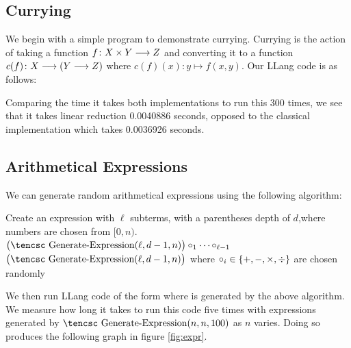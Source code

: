 \documentclass{llncs}
\newcounter{algo}
\begin{document}
\subsection{Currying}

We begin with a simple program to demonstrate currying.
Currying is the action of taking a function $f\colon X\times Y\longrightarrow Z$ and converting it to a function $c(f)\colon X\longrightarrow(Y\longrightarrow Z)$ where $c(f)(x)\colon y\mapsto f(x,y)$.
Our LLang code is as follows:



Comparing the time it takes both implementations to run this 300 times, we see that it takes linear reduction 0.0040886 seconds, opposed to the classical implementation which takes 0.0036926 seconds.

\subsection{Arithmetical Expressions}

We can generate random arithmetical expressions using the following algorithm:

\medskip
\algorithm
\Comment Create an expression with $\ell$ subterms, with a parentheses depth of $d$,\cr where numbers are chosen from $[0,n)$.\EndComment
{}
     \vtop{\hsize=.8\hsize
        \noindent \Return an expression with $\ell$ randomly chosen numbers in\hfil\break $[0,n)$ and $\ell-1$ random operators in $\set{+,-,\times,\div}$.}
    \State \Return $\bigl(\hbox{\tencsc Generate-Expression}(\ell,d-1,n)\bigr)\circ_1\cdots\circ_{\ell-1}$
    \nonum\State \hfill$\bigl(\hbox{\tencsc Generate-Expression}(\ell,d-1,n)\bigr)$
    \nonum\State where $\circ_i\in\set{+,-,\times,\div}$ are chosen randomly
\EndFunc
\ealgorithm
\medskip

\noindent We then run LLang code of the form  where  is generated by the above algorithm.
We measure how long it takes to run this code five times with expressions generated by $\hbox{\tencsc Generate-Expression}(n,n,100)$ as $n$ varies.
Doing so produces the following graph in figure \ref{fig:expr}.
\end{document}
